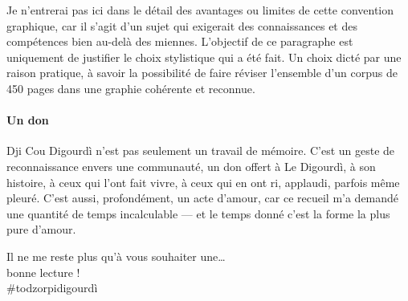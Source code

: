 Je n'entrerai pas ici dans le détail des avantages ou limites de cette convention graphique, car il s'agit d'un sujet qui exigerait des connaissances et des compétences bien au-delà des miennes. L'objectif de ce paragraphe est uniquement de justifier le choix stylistique qui a été fait. Un choix dicté par une raison pratique, à savoir la possibilité de faire réviser l’ensemble d’un corpus de 450 pages dans une graphie cohérente et reconnue.

\paragraph*{Un don}
Dji Cou Digourdì n’est pas seulement un travail de mémoire. C’est un geste de reconnaissance envers une communauté, un don offert à Le Digourdì, à son histoire, à ceux qui l’ont fait vivre, à ceux qui en ont ri, applaudi, parfois même pleuré. C’est aussi, profondément, un acte d’amour, car ce recueil m’a demandé une quantité de temps incalculable — et le temps donné c’est la forme la plus pure d’amour.
\newpage
\begin{center}
Il ne me reste plus qu'à vous souhaiter une\ldots\\\vfill bonne lecture !\\\vfill\#todzorpidigourdì
\end{center}




